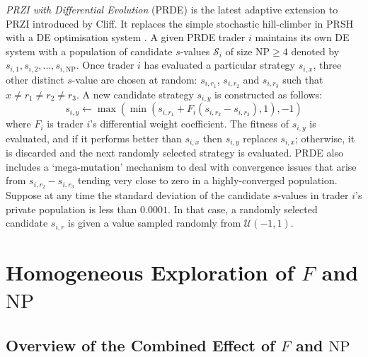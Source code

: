 \documentclass[conference]{IEEEtran}
\begin{document}
\textit{PRZI with Differential Evolution} (PRDE) \cite{PRDE} is the latest adaptive extension to PRZI introduced by Cliff.
It replaces the simple stochastic hill-climber in PRSH with a DE optimisation system \cite{StornPrice}.
A given PRDE trader $i$ maintains its own DE system with a population of candidate $s$-values $\mathcal{S}_i$ of size $\mathrm{NP}\ge4$ denoted by $s_{i,1},s_{i,2},...,s_{i,\mathrm{NP}}$.
Once trader $i$ has evaluated a particular strategy $s_{i,x}$, three other distinct $s$-value are chosen at random: $s_{i,r_1}$, $s_{i,r_2}$ and $s_{i,r_3}$ such that $x\ne r_1\ne r_2\ne r_3$.
A new candidate strategy $s_{i,y}$ is constructed as follows:
\[
s_{i,y}\leftarrow\max(\min(s_{i,r_1}+F_i(s_{i,r_2}-s_{i,r_3}),1), -1)
\]
where $F_i$ is trader $i$'s differential weight coefficient.
The fitness of $s_{i,y}$ is evaluated, and if it performs better than $s_{i,x}$ then $s_{i,y}$ replaces $s_{i,x}$; otherwise, it is discarded and the next randomly selected strategy is evaluated.
PRDE also includes a `mega-mutation' mechanism to deal with convergence issues that arise from $s_{i,r_2}-s_{i,r_3}$ tending very close to zero in a highly-converged population.
Suppose at any time the standard deviation of the candidate $s$-values in trader $i$'s private population is less than $0.0001$.
In that case, a randomly selected candidate $s_{i,r}$ is given a value sampled randomly from $\mathcal{U}(-1,1)$.

\section{Homogeneous Exploration of $F$ and $\mathrm{NP}$}

\subsection{Overview of the Combined Effect of $F$ and $\mathrm{NP}$}
\end{document}
